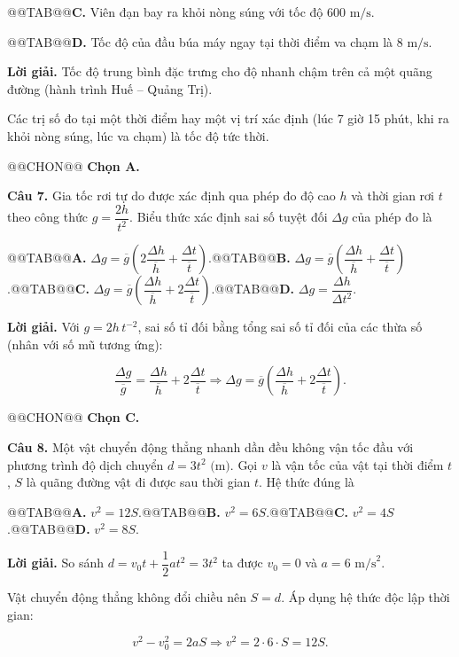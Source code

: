 \documentclass{article}
\begin{document}
@@TAB@@\textbf{C.} Viên đạn bay ra khỏi nòng súng với tốc độ $600\text{ m/s}$.

@@TAB@@\textbf{D.} Tốc độ của đầu búa máy ngay tại thời điểm va chạm là $8\text{ m/s}$.

\textbf{Lời giải.} Tốc độ trung bình đặc trưng cho độ nhanh chậm trên cả một quãng đường (hành trình Huế -- Quảng Trị).

Các trị số đo tại một thời điểm hay một vị trí xác định (lúc 7 giờ 15 phút, khi ra khỏi nòng súng, lúc va chạm) là tốc độ tức thời.

@@CHON@@ \textbf{Chọn A.}

\textbf{Câu 7.} Gia tốc rơi tự do được xác định qua phép đo độ cao $h$ và thời gian rơi $t$ theo công thức $g = \dfrac{2h}{t^2}$. Biểu thức xác định sai số tuyệt đối $\Delta g$ của phép đo là

@@TAB@@\textbf{A.} $\Delta g = \overline{g}\left(2\dfrac{\Delta h}{\overline{h}} + \dfrac{\Delta t}{\overline{t}}\right)$.@@TAB@@\textbf{B.} $\Delta g = \overline{g}\left(\dfrac{\Delta h}{\overline{h}} + \dfrac{\Delta t}{\overline{t}}\right)$.@@TAB@@\textbf{C.} $\Delta g = \overline{g}\left(\dfrac{\Delta h}{\overline{h}} + 2\dfrac{\Delta t}{\overline{t}}\right)$.@@TAB@@\textbf{D.} $\Delta g = \dfrac{\Delta h}{\Delta t^2}$.

\textbf{Lời giải.} Với $g = 2h\,t^{-2}$, sai số tỉ đối bằng tổng sai số tỉ đối của các thừa số (nhân với số mũ tương ứng):

\[\frac{\Delta g}{\overline{g}} = \frac{\Delta h}{\overline{h}} + 2\frac{\Delta t}{\overline{t}} \Rightarrow \Delta g = \overline{g}\left(\frac{\Delta h}{\overline{h}} + 2\frac{\Delta t}{\overline{t}}\right).\]

@@CHON@@ \textbf{Chọn C.}

\textbf{Câu 8.} Một vật chuyển động thẳng nhanh dần đều không vận tốc đầu với phương trình độ dịch chuyển $d = 3t^2\text{ (m)}$. Gọi $v$ là vận tốc của vật tại thời điểm $t$, $S$ là quãng đường vật đi được sau thời gian $t$. Hệ thức đúng là

@@TAB@@\textbf{A.} $v^2 = 12S$.@@TAB@@\textbf{B.} $v^2 = 6S$.@@TAB@@\textbf{C.} $v^2 = 4S$.@@TAB@@\textbf{D.} $v^2 = 8S$.

\textbf{Lời giải.} So sánh $d = v_0t + \dfrac{1}{2}at^2 = 3t^2$ ta được $v_0 = 0$ và $a = 6\text{ m/s}^2$.

Vật chuyển động thẳng không đổi chiều nên $S = d$. Áp dụng hệ thức độc lập thời gian:

\[v^2 - v_0^2 = 2aS \Rightarrow v^2 = 2 \cdot 6 \cdot S = 12S.\]
\end{document}
